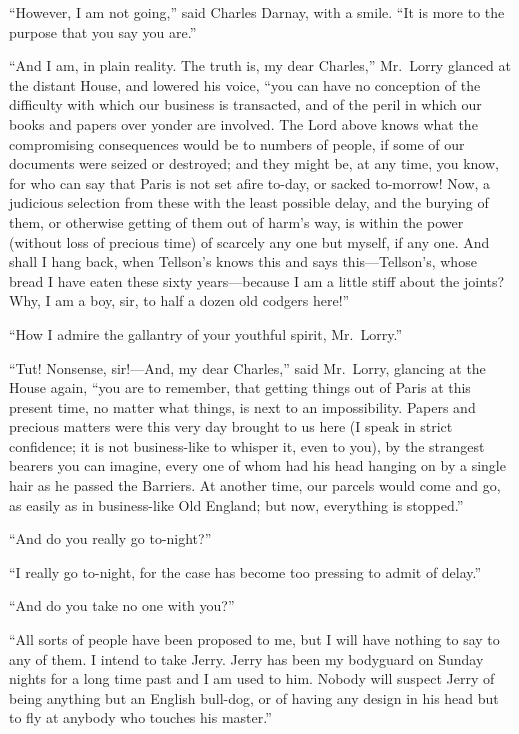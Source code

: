 ``However, I am not going,'' said Charles Darnay, with a smile.  ``It is
more to the purpose that you say you are.''

``And I am, in plain reality.  The truth is, my dear Charles,'' Mr.\ Lorry
glanced at the distant House, and lowered his voice, ``you can have no
conception of the difficulty with which our business is transacted,
and of the peril in which our books and papers over yonder are involved.
The Lord above knows what the compromising consequences would be to
numbers of people, if some of our documents were seized or destroyed;
and they might be, at any time, you know, for who can say that Paris
is not set afire to-day, or sacked to-morrow!  Now, a judicious selection
from these with the least possible delay, and the burying of them,
or otherwise getting of them out of harm's way, is within the power
(without loss of precious time) of scarcely any one but myself,
if any one.  And shall I hang back, when Tellson's knows this and says
this---Tellson's, whose bread I have eaten these sixty years---because
I am a little stiff about the joints?  Why, I am a boy, sir, to half
a dozen old codgers here!''

``How I admire the gallantry of your youthful spirit, Mr.\ Lorry.''

``Tut!  Nonsense, sir!---And, my dear Charles,'' said Mr.\ Lorry, glancing
at the House again, ``you are to remember, that getting things out of
Paris at this present time, no matter what things, is next to an
impossibility.  Papers and precious matters were this very day brought
to us here (I speak in strict confidence; it is not business-like to
whisper it, even to you), by the strangest bearers you can imagine,
every one of whom had his head hanging on by a single hair as he
passed the Barriers.  At another time, our parcels would come and go,
as easily as in business-like Old England; but now, everything
is stopped.''

``And do you really go to-night?''

``I really go to-night, for the case has become too pressing to
admit of delay.''

``And do you take no one with you?''

``All sorts of people have been proposed to me, but I will have
nothing to say to any of them.  I intend to take Jerry.  Jerry has
been my bodyguard on Sunday nights for a long time past and I am used
to him.  Nobody will suspect Jerry of being anything but an English
bull-dog, or of having any design in his head but to fly at anybody
who touches his master.''

